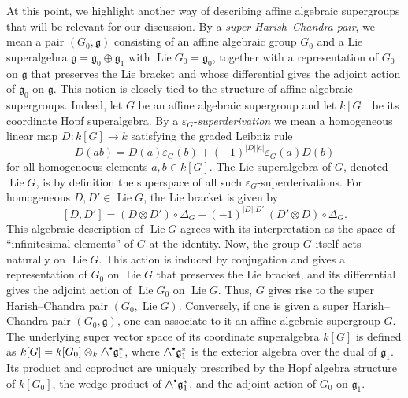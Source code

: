 \documentclass[11pt,a4paper,reqno,noamsfonts]{amsart}
\numberwithin{equation}{section}
\theoremstyle{definition}
\theoremstyle{remark}
\newcommand{\gfrak}{\ensuremath{\mathfrak{g}}}
\DeclareMathOperator{\Lie}{Lie}
\newcommand{\medwedge}{\mathbin{\scalebox{1.2}{$\wedge$}}}
\newcommand*{\sbullet}{\raisebox{0.1ex}{\scalebox{0.6}{$\bullet$}}}
\begin{document}
At this point, we highlight another way of describing affine algebraic supergroups that will be relevant for our discussion. By a \emph{super Harish--Chandra pair}, we mean a pair $(G_0,\gfrak)$ consisting of an affine algebraic group $G_0$ and a Lie superalgebra $\gfrak=\gfrak_0\oplus\gfrak_1$ with $\Lie G_0=\gfrak_0$, together with a representation of $G_0$ on $\gfrak$ that preserves the Lie bracket and whose differential gives the adjoint action of $\gfrak_0$ on $\gfrak$. This notion is closely tied to the structure of affine algebraic supergroups. Indeed, let $G$ be an affine algebraic supergroup and let $k[G]$ be its coordinate Hopf superalgebra. By a $\varepsilon_G$-\emph{superderivation} we mean a homogeneous linear map $D\colon k[G]\to k$ satisfying the graded Leibniz rule
\begin{equation}\label{eq:2.16}
D(ab) = D(a)\varepsilon_G(b)+(-1)^{\lvert D \rvert \lvert a \rvert}\varepsilon_G(a)D(b)
\end{equation}
for all homogenoeus elements $a, b \in k[G]$. The Lie superalgebra of $G$, denoted $\Lie G$, is by definition the superspace of all such $\varepsilon_G$-superderivations. For homogeneous $D,D'\in\Lie G$, the Lie bracket is given by 
\begin{equation}\label{eq:2.17}
[D,D'] = (D \otimes D') \circ \Delta_G - (-1)^{\lvert D \rvert \lvert D' \rvert} (D' \otimes D) \circ \Delta_G.
\end{equation}
This algebraic description of $\Lie G$ agrees with its interpretation as the space of ``infinitesimal elements'' of $G$ at the identity. Now, the group $G$ itself acts naturally on $\Lie G$. This action is induced by conjugation and gives a representation of $G_0$ on $\Lie G$ that preserves the Lie bracket, and its differential gives the adjoint action of $\Lie G_0$ on $\Lie G$. Thus, $G$ gives rise to the super Harish--Chandra pair $(G_0,\Lie G)$. Conversely, if one is given a super Harish--Chandra pair $(G_0, \gfrak)$, one can associate to it an affine algebraic supergroup $G$. The underlying super vector space of its coordinate superalgebra $k[G]$ is defined as $k[G]=k[G_{0}]\otimes _{k}\medwedge^{\sbullet} \gfrak_{1}^{*}$, where $\medwedge^{\sbullet} \gfrak_{1}^{*}$ is the exterior algebra over the dual of $\gfrak_{1}$. Its product and coproduct are uniquely prescribed by the Hopf algebra structure of $k[G_0]$, the wedge product of $\medwedge^{\sbullet} \gfrak_{1}^{*}$, and the adjoint action of $G_{0}$ on $\mathfrak{g}_{1}$.
\end{document}
